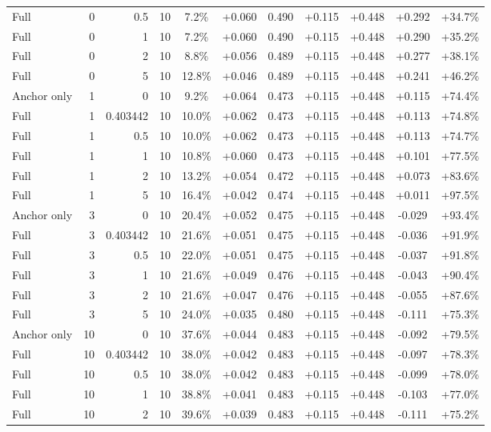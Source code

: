 \begin{table}[htbp]
\begin{tabular}{lrrrccccccc}
Full & 0 & 0.5 & 10 & 7.2\% & +0.060 & 0.490 & +0.115 & +0.448 & +0.292 & +34.7\% \\
Full & 0 & 1 & 10 & 7.2\% & +0.060 & 0.490 & +0.115 & +0.448 & +0.290 & +35.2\% \\
Full & 0 & 2 & 10 & 8.8\% & +0.056 & 0.489 & +0.115 & +0.448 & +0.277 & +38.1\% \\
Full & 0 & 5 & 10 & 12.8\% & +0.046 & 0.489 & +0.115 & +0.448 & +0.241 & +46.2\% \\
Anchor only & 1 & 0 & 10 & 9.2\% & +0.064 & 0.473 & +0.115 & +0.448 & +0.115 & +74.4\% \\
Full & 1 & 0.403442 & 10 & 10.0\% & +0.062 & 0.473 & +0.115 & +0.448 & +0.113 & +74.8\% \\
Full & 1 & 0.5 & 10 & 10.0\% & +0.062 & 0.473 & +0.115 & +0.448 & +0.113 & +74.7\% \\
Full & 1 & 1 & 10 & 10.8\% & +0.060 & 0.473 & +0.115 & +0.448 & +0.101 & +77.5\% \\
Full & 1 & 2 & 10 & 13.2\% & +0.054 & 0.472 & +0.115 & +0.448 & +0.073 & +83.6\% \\
Full & 1 & 5 & 10 & 16.4\% & +0.042 & 0.474 & +0.115 & +0.448 & +0.011 & +97.5\% \\
Anchor only & 3 & 0 & 10 & 20.4\% & +0.052 & 0.475 & +0.115 & +0.448 & -0.029 & +93.4\% \\
Full & 3 & 0.403442 & 10 & 21.6\% & +0.051 & 0.475 & +0.115 & +0.448 & -0.036 & +91.9\% \\
Full & 3 & 0.5 & 10 & 22.0\% & +0.051 & 0.475 & +0.115 & +0.448 & -0.037 & +91.8\% \\
Full & 3 & 1 & 10 & 21.6\% & +0.049 & 0.476 & +0.115 & +0.448 & -0.043 & +90.4\% \\
Full & 3 & 2 & 10 & 21.6\% & +0.047 & 0.476 & +0.115 & +0.448 & -0.055 & +87.6\% \\
Full & 3 & 5 & 10 & 24.0\% & +0.035 & 0.480 & +0.115 & +0.448 & -0.111 & +75.3\% \\
Anchor only & 10 & 0 & 10 & 37.6\% & +0.044 & 0.483 & +0.115 & +0.448 & -0.092 & +79.5\% \\
Full & 10 & 0.403442 & 10 & 38.0\% & +0.042 & 0.483 & +0.115 & +0.448 & -0.097 & +78.3\% \\
Full & 10 & 0.5 & 10 & 38.0\% & +0.042 & 0.483 & +0.115 & +0.448 & -0.099 & +78.0\% \\
Full & 10 & 1 & 10 & 38.8\% & +0.041 & 0.483 & +0.115 & +0.448 & -0.103 & +77.0\% \\
Full & 10 & 2 & 10 & 39.6\% & +0.039 & 0.483 & +0.115 & +0.448 & -0.111 & +75.2\% \\

\end{tabular}
\end{table}

